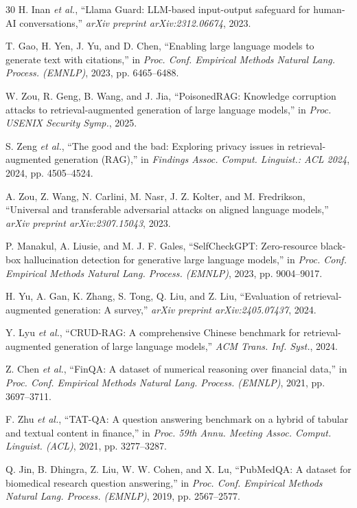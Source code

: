\documentclass[conference]{IEEEtran}
\begin{document}
\begin{thebibliography}{30}
H. Inan \emph{et al.}, ``Llama Guard: LLM-based input-output safeguard for human-AI conversations,'' \emph{arXiv preprint arXiv:2312.06674}, 2023.

T. Gao, H. Yen, J. Yu, and D. Chen, ``Enabling large language models to generate text with citations,'' in \emph{Proc. Conf. Empirical Methods Natural Lang. Process. (EMNLP)}, 2023, pp. 6465--6488.

W. Zou, R. Geng, B. Wang, and J. Jia, ``PoisonedRAG: Knowledge corruption attacks to retrieval-augmented generation of large language models,'' in \emph{Proc. USENIX Security Symp.}, 2025.

S. Zeng \emph{et al.}, ``The good and the bad: Exploring privacy issues in retrieval-augmented generation (RAG),'' in \emph{Findings Assoc. Comput. Linguist.: ACL 2024}, 2024, pp. 4505--4524.

A. Zou, Z. Wang, N. Carlini, M. Nasr, J. Z. Kolter, and M. Fredrikson, ``Universal and transferable adversarial attacks on aligned language models,'' \emph{arXiv preprint arXiv:2307.15043}, 2023.

P. Manakul, A. Liusie, and M. J. F. Gales, ``SelfCheckGPT: Zero-resource black-box hallucination detection for generative large language models,'' in \emph{Proc. Conf. Empirical Methods Natural Lang. Process. (EMNLP)}, 2023, pp. 9004--9017.

H. Yu, A. Gan, K. Zhang, S. Tong, Q. Liu, and Z. Liu, ``Evaluation of retrieval-augmented generation: A survey,'' \emph{arXiv preprint arXiv:2405.07437}, 2024.

Y. Lyu \emph{et al.}, ``CRUD-RAG: A comprehensive Chinese benchmark for retrieval-augmented generation of large language models,'' \emph{ACM Trans. Inf. Syst.}, 2024.

Z. Chen \emph{et al.}, ``FinQA: A dataset of numerical reasoning over financial data,'' in \emph{Proc. Conf. Empirical Methods Natural Lang. Process. (EMNLP)}, 2021, pp. 3697--3711.

F. Zhu \emph{et al.}, ``TAT-QA: A question answering benchmark on a hybrid of tabular and textual content in finance,'' in \emph{Proc. 59th Annu. Meeting Assoc. Comput. Linguist. (ACL)}, 2021, pp. 3277--3287.

Q. Jin, B. Dhingra, Z. Liu, W. W. Cohen, and X. Lu, ``PubMedQA: A dataset for biomedical research question answering,'' in \emph{Proc. Conf. Empirical Methods Natural Lang. Process. (EMNLP)}, 2019, pp. 2567--2577.


\end{thebibliography}
\end{document}
